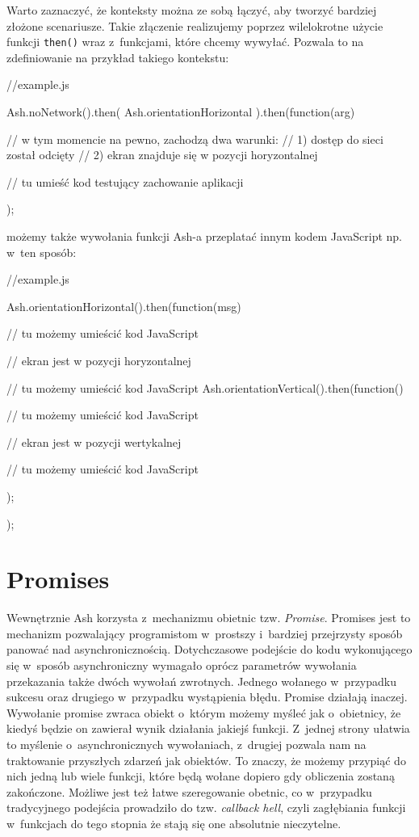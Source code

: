 \documentclass[brudnopis]{xmgr}
\begin{document}
Warto zaznaczyć, że konteksty można ze sobą łączyć, aby tworzyć bardziej złożone scenariusze. Takie złączenie realizujemy poprzez wilelokrotne użycie funkcji \texttt{then()} wraz z~funkcjami, które chcemy wywyłać. Pozwala to na zdefiniowanie na przykład takiego kontekstu:

\begin{javascriptcode}
     //example.js

    Ash.noNetwork().then(
	    Ash.orientationHorizontal
    ).then(function(arg){
      	//  w tym momencie na pewno, zachodzą dwa warunki: 
      	//  1) dostęp do sieci został odcięty  
      	//  2) ekran znajduje się w pozycji horyzontalnej 

      	// tu umieść kod testujący zachowanie aplikacji  
    });
\end{javascriptcode}

możemy także wywołania funkcji Ash-a przeplatać innym kodem JavaScript np. w~ten sposób:

\begin{javascriptcode}
     //example.js

    Ash.orientationHorizontal().then(function(msg){
	//  tu możemy umieścić kod JavaScript 
      	
	// ekran jest w pozycji horyzontalnej
      
	//  tu możemy umieścić kod JavaScript 
      	Ash.orientationVertical().then(function(){
		//  tu możemy umieścić kod JavaScript 

		// ekran jest w pozycji wertykalnej 

		//  tu możemy umieścić kod JavaScript 
      	});
    });
\end{javascriptcode}

\section{Promises}

Wewnętrznie Ash korzysta z~mechanizmu obietnic tzw. \textit{Promise}. Promises jest to mechanizm pozwalający programistom w~prostszy i~bardziej przejrzysty sposób panować nad asynchronicznością. Dotychczasowe podejście do kodu wykonującego się w~sposób asynchroniczny wymagało oprócz parametrów wywołania przekazania także dwóch wywołań zwrotnych. Jednego wołanego w~przypadku sukcesu oraz drugiego w~przypadku wystąpienia błędu. Promise działają inaczej. Wywołanie promise zwraca obiekt o~którym możemy myśleć jak o~obietnicy, że kiedyś będzie on zawierał wynik działania jakiejś funkcji. Z~jednej strony ułatwia to myślenie o~asynchronicznych wywołaniach, z~drugiej pozwala nam na traktowanie przyszłych zdarzeń jak obiektów. To znaczy, że możemy przypiąć do nich jedną lub wiele funkcji, które będą wołane dopiero gdy obliczenia zostaną zakończone. Możliwe jest też łatwe szeregowanie obetnic, co w~przypadku tradycyjnego podejścia prowadziło do tzw. \textit{callback hell}, czyli zagłębiania funkcji w~funkcjach do tego stopnia że stają się one absolutnie nieczytelne. 
\end{document}
